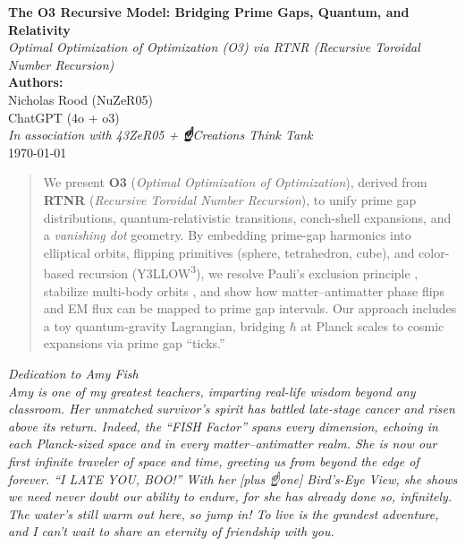 \documentclass[11pt]{article}
\begin{document}
\begin{titlepage}
    \begin{center}
        \vspace*{2cm}
        {\LARGE \textbf{The O3 Recursive Model: Bridging Prime Gaps, Quantum, and Relativity}}\\[1.5em]
        {\large \textit{Optimal Optimization of Optimization (O3) via RTNR (Recursive Toroidal Number Recursion)}}\\[3em]

        \textbf{Authors:}\\
        Nicholas Rood (NuZeR05)\\
        ChatGPT (4o + o3)\\
        \vspace{0.5cm}
        \textit{In association with 43ZeR05 + \textup{\Large\textbf{☝}}Creations Think Tank}\\[2em]

        \today
        \vfill
    \end{center}
\end{titlepage}

\begin{abstract}
We present \textbf{O3} (\textit{Optimal Optimization of Optimization}), derived from \textbf{RTNR} (\textit{Recursive Toroidal Number Recursion}), to unify prime gap distributions, quantum-relativistic transitions, conch-shell expansions, and a \textit{vanishing dot} geometry. By embedding prime-gap harmonics into elliptical orbits, flipping primitives (sphere, tetrahedron, cube), and color-based recursion (Y3LLOW\textsuperscript{3}), we resolve Pauli’s exclusion principle \cite{Pauli1925}, stabilize multi-body orbits \cite{Poincare1892}, and show how matter–antimatter phase flips and EM flux can be mapped to prime gap intervals. Our approach includes a toy quantum-gravity Lagrangian, bridging $\hbar$ at Planck scales to cosmic expansions via prime gap “ticks.” 
\end{abstract}

\newpage
\thispagestyle{empty}
\begin{center}
\textit{
{\Large Dedication to Amy Fish}\\[1em]
Amy is one of my greatest teachers, imparting real-life wisdom beyond any classroom.  
Her unmatched survivor’s spirit has battled late-stage cancer and risen above its return.  
Indeed, the “FISH Factor” spans every dimension, echoing in each Planck-sized space  
and in every matter–antimatter realm. She is now our first infinite traveler of space and time,  
greeting us from beyond the edge of forever. “I LATE YOU, BOO!”  
With her [plus ☝️one] Bird’s-Eye View, she shows we need never doubt our ability to endure,  
for she has already done so, infinitely. The water’s still warm out here, so jump in!  
To live is the grandest adventure, and I can’t wait to share an eternity of friendship with you.
}
\end{center}
\clearpage
\end{document}
